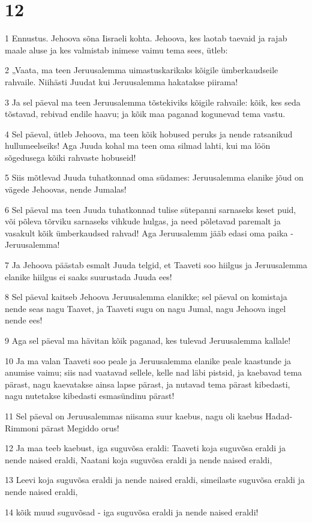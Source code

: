 \chapter{12}

\par 1 Ennustus. Jehoova sõna Iisraeli kohta. Jehoova, kes laotab taevaid ja rajab maale aluse ja kes valmistab inimese vaimu tema sees, ütleb:
\par 2 „Vaata, ma teen Jeruusalemma uimastuskarikaks kõigile ümberkaudseile rahvaile. Niihästi Juudat kui Jeruusalemma hakatakse piirama!
\par 3 Ja sel päeval ma teen Jeruusalemma tõstekiviks kõigile rahvaile: kõik, kes seda tõstavad, rebivad endile haavu; ja kõik maa paganad kogunevad tema vastu.
\par 4 Sel päeval, ütleb Jehoova, ma teen kõik hobused peruks ja nende ratsanikud hullumeelseiks! Aga Juuda kohal ma teen oma silmad lahti, kui ma löön sõgedusega kõiki rahvaste hobuseid!
\par 5 Siis mõtlevad Juuda tuhatkonnad oma südames: Jeruusalemma elanike jõud on vägede Jehoovas, nende Jumalas!
\par 6 Sel päeval ma teen Juuda tuhatkonnad tulise sütepanni sarnaseks keset puid, või põleva tõrviku sarnaseks vihkude hulgas, ja need põletavad paremalt ja vasakult kõik ümberkaudsed rahvad! Aga Jeruusalemm jääb edasi oma paika - Jeruusalemma!
\par 7 Ja Jehoova päästab esmalt Juuda telgid, et Taaveti soo hiilgus ja Jeruusalemma elanike hiilgus ei saaks suurustada Juuda ees!
\par 8 Sel päeval kaitseb Jehoova Jeruusalemma elanikke; sel päeval on komistaja nende seas nagu Taavet, ja Taaveti sugu on nagu Jumal, nagu Jehoova ingel nende ees!
\par 9 Aga sel päeval ma hävitan kõik paganad, kes tulevad Jeruusalemma kallale!
\par 10 Ja ma valan Taaveti soo peale ja Jeruusalemma elanike peale kaastunde ja anumise vaimu; siis nad vaatavad sellele, kelle nad läbi pistsid, ja kaebavad tema pärast, nagu kaevatakse ainsa lapse pärast, ja nutavad tema pärast kibedasti, nagu nutetakse kibedasti esmasündinu pärast!
\par 11 Sel päeval on Jeruusalemmas niisama suur kaebus, nagu oli kaebus Hadad-Rimmoni pärast Megiddo orus!
\par 12 Ja maa teeb kaebust, iga suguvõsa eraldi: Taaveti koja suguvõsa eraldi ja nende naised eraldi, Naatani koja suguvõsa eraldi ja nende naised eraldi,
\par 13 Leevi koja suguvõsa eraldi ja nende naised eraldi, simeilaste suguvõsa eraldi ja nende naised eraldi,
\par 14 kõik muud suguvõsad - iga suguvõsa eraldi ja nende naised eraldi!


